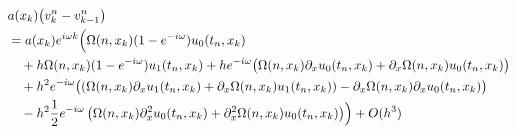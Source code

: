 \begin{align}\label{eq:wkb:adiff}
\begin{split}
&a(x_k) \bigl( v^n_k - v^n_{k-1} \bigr)\\
&=
a(x_k) e^{i \omega k} \Bigl( \Omega(n,x_k) (1-e^{-i\omega}) u_0(t_n, x_k)\\
&\quad + h \Omega(n,x_k) (1 - e^{-i \omega}) u_1(t_n, x_k) + h e^{-i \omega} \bigl( \Omega(n,x_k) \partial_x u_0(t_n, x_k) + \partial_x \Omega(n,x_k)  u_0(t_n, x_k) \bigr)\\
&\quad + h^2 e^{-i\omega}  \bigl( \left( \Omega(n,x_k) \partial_x u_1(t_n, x_k) + \partial_x \Omega(n,x_k) u_1(t_n,x_k) \right) - \partial_x \Omega(n,x_k) \partial_x u_0(t_n, x_k) \bigr)\\
&\quad - h^2 \frac{1}{2} e^{-i\omega} \left( \Omega(n,x_k) \partial^2_x u_0(t_n, x_k) + \partial^2_x \Omega(n, x_k) u_0(t_n, x_k) \right)   \Bigr) + O(h^3)\\
\end{split}
\end{align}

